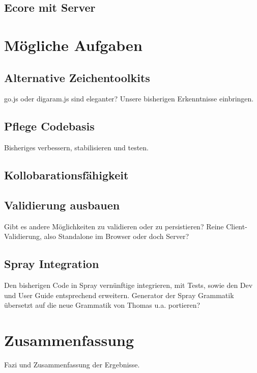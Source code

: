 \subsection{Ecore mit Server}


\section{Mögliche Aufgaben}

\subsection{Alternative Zeichentoolkits}

go.js oder digaram.js sind eleganter?
Unsere bisherigen Erkenntnisse einbringen.

\subsection{Pflege Codebasis}

Bisheriges verbessern, stabilisieren und testen.

\subsection{Kollobarationsfähigkeit}

\subsection{Validierung ausbauen}

Gibt es andere Möglichkeiten zu validieren oder zu persistieren?
Reine Client-Validierung, also Standalone im Browser oder doch Server?

\subsection{Spray Integration}

Den bisherigen Code in Spray vernünftige integrieren, mit Tests, sowie
den Dev und User Guide entsprechend erweitern.
Generator der Spray Grammatik übersetzt auf die neue Grammatik von Thomas u.a.
portieren?


\section{Zusammenfassung}

Fazi und Zusammenfassung der Ergebnisse.
